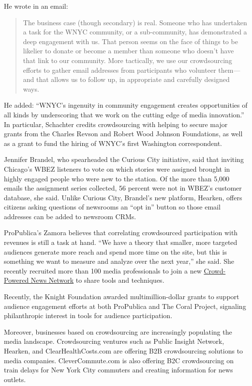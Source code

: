 \begin{itemize}
He wrote in an email:
\begin{quote}
The business case (though secondary) is real. Someone who has undertaken a task for the WNYC community, or a sub-community, has demonstrated a deep engagement with us. That person seems on the face of things to be likelier to donate or become a member than someone who doesn’t have that link to our community. More tactically, we use our crowdsourcing efforts to gather email addresses from participants who volunteer them---and that allows us to follow up, in appropriate and carefully designed ways.
\end{quote}
He added: ``WNYC’s ingenuity in community engagement creates opportunities of all kinds by underscoring that we work on the cutting edge of media innovation.'' In particular, Schachter credits crowdsourcing with helping to secure major grants from the Charles Revson and Robert Wood Johnson Foundations, as well as a grant to fund the hiring of WNYC’s first Washington correspondent. 

Jennifer Brandel, who spearheaded the Curious City initiative, said that inviting Chicago’s WBEZ listeners to vote on which stories were assigned brought in highly engaged people who were new to the station. Of the more than 5,000 emails the assignment series collected, 56 percent were not in WBEZ's customer database, she said. Unlike Curious City, Brandel’s new platform, Hearken, offers citizens asking questions of newsrooms an ``opt in'' button so those email addresses can be added to newsroom CRMs.\autocite{Brandel}

ProPublica’s Zamora believes that correlating crowdsourced participation with revenues is still a task at hand. ``We have a theory that smaller, more targeted audiences generate more reach and spend more time on the site, but this is something we want to measure and analyze over the next year,'' she said. She recently recruited more than 100 media professionals to join a new \href{https://docs.google.com/forms/d/170joKlpiLfn8qlnT7lxSJgJKq1IDg_KVilezkbE68U0/viewform}{Crowd-Powered News Network} to share tools and techniques.\autocite{CPNN} 

Recently, the Knight Foundation awarded multimillion-dollar grants to support audience engagement efforts at both ProPublica and The Coral Project, signaling philanthropic interest in tools for audience participation. 

Moreover, businesses based on crowdsourcing are increasingly populating the media landscape. Crowdsourcing ventures such as Public Insight Network, Hearken, and ClearHealthCosts.com\autocite{Jeanne} are offering B2B crowdsourcing solutions to media companies. CleverCommute.com is also offering B2C crowdsourcing on train delays for New York City commuters and creating information for news outlets.


\end{itemize}
